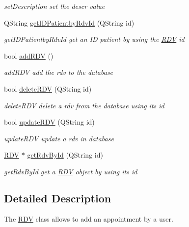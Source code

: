 \begin{DoxyCompactItemize}
\begin{DoxyCompactList}\small\item\em set\+Description set the descr value \end{DoxyCompactList}\item 
Q\+String \mbox{\hyperlink{class_r_d_v_a3b764f633b3e46a8719313d40a177816}{get\+I\+D\+Patientby\+Rdv\+Id}} (Q\+String id)
\begin{DoxyCompactList}\small\item\em get\+I\+D\+Patientby\+Rdv\+Id get an ID patient by using the \mbox{\hyperlink{class_r_d_v}{R\+DV}} id \end{DoxyCompactList}\item 
bool \mbox{\hyperlink{class_r_d_v_a3ab6ae9c0c5e3fcec6e7fcffdefc8173}{add\+R\+DV}} ()
\begin{DoxyCompactList}\small\item\em add\+R\+DV add the rdv to the database \end{DoxyCompactList}\item 
bool \mbox{\hyperlink{class_r_d_v_a6ea7f74dd40c1a362ce0d048337edba4}{delete\+R\+DV}} (Q\+String id)
\begin{DoxyCompactList}\small\item\em delete\+R\+DV delete a rdv from the database using its id \end{DoxyCompactList}\item 
bool \mbox{\hyperlink{class_r_d_v_a8cb9edc787a972719f3ad52873be4780}{update\+R\+DV}} (Q\+String id)
\begin{DoxyCompactList}\small\item\em update\+R\+DV update a rdv in database \end{DoxyCompactList}\item 
\mbox{\hyperlink{class_r_d_v}{R\+DV}} $\ast$ \mbox{\hyperlink{class_r_d_v_a3f185b11330f86553df52e7a64fa8c6f}{get\+Rdv\+By\+Id}} (Q\+String id)
\begin{DoxyCompactList}\small\item\em get\+Rdv\+By\+Id get a \mbox{\hyperlink{class_r_d_v}{R\+DV}} object by using its id \end{DoxyCompactList}\end{DoxyCompactItemize}


\subsection{Detailed Description}
The \mbox{\hyperlink{class_r_d_v}{R\+DV}} class allows to add an appointment by a user. 

